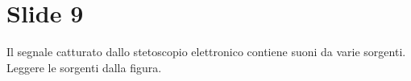 \section{Slide 9}
Il segnale catturato dallo stetoscopio elettronico contiene suoni da varie sorgenti.
Leggere le sorgenti dalla figura.